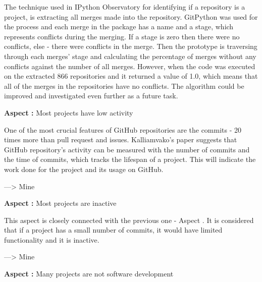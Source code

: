 The technique used in IPython Observatory for identifying if a repository is a project, is extracting all merges made into the repository. GitPython was used for the process and each merge in the package has a name and a stage, which represents conflicts during the merging. If a stage is zero then there were no conflicts, else - there were conflicts in the merge. Then the prototype is traversing through each merges' stage and calculating the percentage of merges without any conflicts against the number of all merges. However, when the code was executed on the extracted 866 repositories and it returned a value of 1.0, which means that all of the merges in the repositories have no conflicts. The algorithm could be improved and investigated even further as a future task. 

\vspace{5mm}
\begin{mdframed}
\vspace{1px}
\textbf{Aspect :}  Most projects have low activity
\vspace{1px}
\end{mdframed}
\vspace{2mm}

One of the most crucial features of GitHub repositories are the commits - 20 times more than pull request and issues\cite{kalliamvakoupromises}. Kalliamvako's paper\cite{kalliamvakoupromises} suggests that GitHub repository's activity can be measured with the number of commits and the time of commits, which tracks the lifespan of a project. This will indicate the work done for the project and its usage on GitHub.

---> Mine

\vspace{5mm}
\begin{mdframed}
\vspace{1px}
\textbf{Aspect :}  Most projects are inactive
\vspace{1px}
\end{mdframed}
\vspace{2mm}

This aspect is closely connected with the previous one - Aspect . It is considered that if a project has a small number of commits, it would have limited functionality and it is inactive. 

---> Mine

\vspace{5mm}
\begin{mdframed}
\vspace{1px}
\textbf{Aspect :}  Many projects are not software development
\vspace{1px}
\end{mdframed}
\vspace{2mm}

